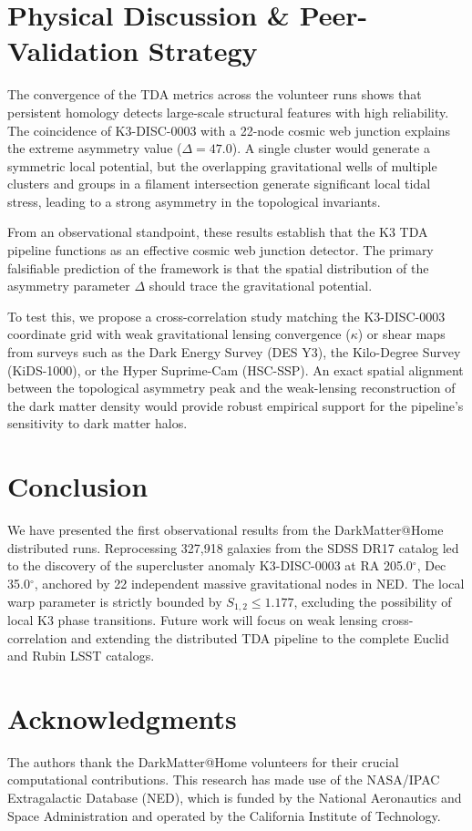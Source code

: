 \documentclass[aps,prd,twocolumn,nofootinbib,superscriptaddress,10pt]{revtex4-2}
\begin{document}
\section{Physical Discussion \& Peer-Validation Strategy}

The convergence of the TDA metrics across the volunteer runs shows that persistent homology detects large-scale structural features with high reliability. The coincidence of K3-DISC-0003 with a 22-node cosmic web junction explains the extreme asymmetry value ($\Delta = 47.0$). A single cluster would generate a symmetric local potential, but the overlapping gravitational wells of multiple clusters and groups in a filament intersection generate significant local tidal stress, leading to a strong asymmetry in the topological invariants.

From an observational standpoint, these results establish that the K3 TDA pipeline functions as an effective cosmic web junction detector. The primary falsifiable prediction of the framework is that the spatial distribution of the asymmetry parameter $\Delta$ should trace the gravitational potential. 

To test this, we propose a cross-correlation study matching the K3-DISC-0003 coordinate grid with weak gravitational lensing convergence ($\kappa$) or shear maps from surveys such as the Dark Energy Survey (DES Y3), the Kilo-Degree Survey (KiDS-1000), or the Hyper Suprime-Cam (HSC-SSP). An exact spatial alignment between the topological asymmetry peak and the weak-lensing reconstruction of the dark matter density would provide robust empirical support for the pipeline's sensitivity to dark matter halos.

\section{Conclusion}

We have presented the first observational results from the DarkMatter@Home distributed runs. Reprocessing 327,918 galaxies from the SDSS DR17 catalog led to the discovery of the supercluster anomaly K3-DISC-0003 at RA 205.0$^\circ$, Dec 35.0$^\circ$, anchored by 22 independent massive gravitational nodes in NED. The local warp parameter is strictly bounded by $S_{1,2} \le 1.177$, excluding the possibility of local K3 phase transitions. Future work will focus on weak lensing cross-correlation and extending the distributed TDA pipeline to the complete Euclid and Rubin LSST catalogs.

\section*{Acknowledgments}
The authors thank the DarkMatter@Home volunteers for their crucial computational contributions. This research has made use of the NASA/IPAC Extragalactic Database (NED), which is funded by the National Aeronautics and Space Administration and operated by the California Institute of Technology.
\end{document}
